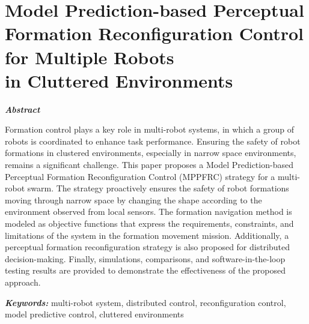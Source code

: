 \chapter{Model Prediction-based Perceptual Formation Reconfiguration Control for Multiple Robots\\in Cluttered Environments}\label{paper3}

\vspace{1cm}

\noindent\textit{\textbf{Abstract}}

Formation control plays a key role in multi-robot systems, in which a group of robots is coordinated to enhance task performance. Ensuring the safety of robot formations in clustered environments, especially in narrow space environments, remains a significant challenge. This paper proposes a Model Prediction-based Perceptual Formation Reconfiguration Control (MPPFRC) strategy for a multi-robot swarm. The strategy proactively ensures the safety of robot formations moving through narrow space by changing the shape according to the environment observed from local sensors. The formation navigation method is modeled as objective functions that express the requirements, constraints, and limitations of the system in the formation movement mission. Additionally, a perceptual formation reconfiguration strategy is also proposed for distributed decision-making. Finally, simulations, comparisons, and software-in-the-loop testing results are provided to demonstrate the effectiveness of the proposed approach.

\noindent\textbf{\textit{Keywords:}}
multi-robot system, distributed control, reconfiguration control, model predictive control, cluttered environments







